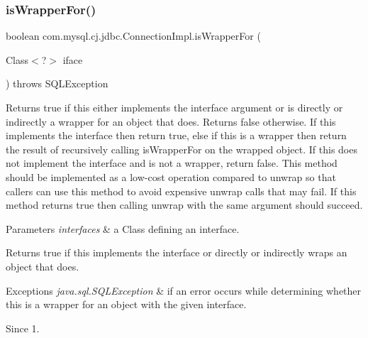 \subsubsection{\texorpdfstring{is\+Wrapper\+For()}{isWrapperFor()}}
{\footnotesize\ttfamily boolean com.\+mysql.\+cj.\+jdbc.\+Connection\+Impl.\+is\+Wrapper\+For (\begin{DoxyParamCaption}\item[{Class$<$?$>$}]{iface }\end{DoxyParamCaption}) throws S\+Q\+L\+Exception}

Returns true if this either implements the interface argument or is directly or indirectly a wrapper for an object that does. Returns false otherwise. If this implements the interface then return true, else if this is a wrapper then return the result of recursively calling {\ttfamily is\+Wrapper\+For} on the wrapped object. If this does not implement the interface and is not a wrapper, return false. This method should be implemented as a low-\/cost operation compared to {\ttfamily unwrap} so that callers can use this method to avoid expensive {\ttfamily unwrap} calls that may fail. If this method returns true then calling {\ttfamily unwrap} with the same argument should succeed.


\begin{DoxyParams}{Parameters}
{\em interfaces} & a Class defining an interface. \\
\hline
\end{DoxyParams}
\begin{DoxyReturn}{Returns}
true if this implements the interface or directly or indirectly wraps an object that does. 
\end{DoxyReturn}

\begin{DoxyExceptions}{Exceptions}
{\em java.\+sql.\+S\+Q\+L\+Exception} & if an error occurs while determining whether this is a wrapper for an object with the given interface. \\
\hline
\end{DoxyExceptions}
\begin{DoxySince}{Since}
1. 
\end{DoxySince}
\mbox{\label{classcom_1_1mysql_1_1cj_1_1jdbc_1_1_connection_impl_a75475406eba7048aeb899c27d04f2c59}} 
